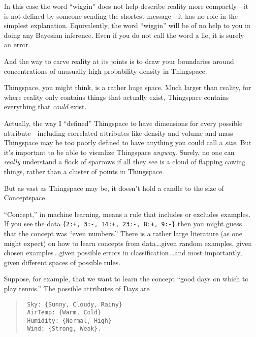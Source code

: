 {{{
 In this case the word
``wiggin'' does not help describe
reality more compactly---it is not defined by someone sending the
shortest message---it has no role in the simplest explanation.
Equivalently, the word ``wiggin''
will be of no help to you in doing any Bayesian inference. Even if you
do not call the word a lie, it is surely an error.}

{
 And the way to carve reality at its joints is to draw your
boundaries around concentrations of unusually high probability density
in Thingspace.}

\myendsectiontext


{
 Thingspace, you might think, is a rather huge space. Much larger
than reality, for where reality only contains things that actually
exist, Thingspace contains everything that \textit{could} exist. }

{
 Actually, the way I ``defined''
Thingspace to have dimensions for every possible attribute---including
correlated attributes like density and volume and mass---Thingspace may
be too poorly defined to have anything you could call a \textit{size}.
But it's important to be able to visualize Thingspace
\textit{anyway}. Surely, no one can \textit{really} understand a flock
of sparrows if all they see is a cloud of flapping cawing things,
rather than a cluster of points in Thingspace.}

{
 But as vast as Thingspace may be, it doesn't hold
a candle to the size of Conceptspace.}

{
 ``Concept,'' in machine
learning, means a rule that includes or excludes examples. If you see
the data \texttt{\{2:+, 3:-, 14:+, 23:-, 8:+,
9:-\}} then you might guess that the
concept was ``even numbers.'' There
is a rather large literature (as one might expect) on how to learn
concepts from data\,\ldots given random examples, given chosen examples\,\ldots given possible errors in classification\,\ldots and most
importantly, given different spaces of possible rules.}

{
 Suppose, for example, that we want to learn the concept
``good days on which to play
tennis.'' The possible attributes of Days are}

\begin{verse}
\texttt{ Sky: \{Sunny, Cloudy, Rainy\} }\\
\texttt{ AirTemp: \{Warm, Cold\} }\\
\texttt{ Humidity: \{Normal, High\} }\\
\texttt{ Wind: \{Strong, Weak\}. }\\
\end{verse}

}}
